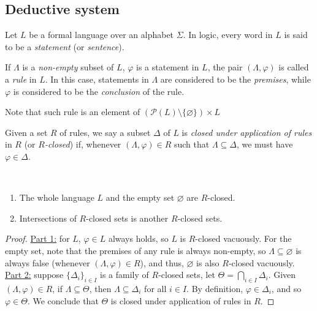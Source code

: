 \documentclass{treatise}
\begin{document}
\begin{shaded}
\section{Deductive system}
\begin{definition}
Let $L$ be a formal language over an alphabet $\Sigma$. In logic, every word in $L$ is said to be a \emph{statement} (or \emph{sentence}).
\end{definition}
\begin{definition}
If $\Lambda$ is a \textit{non-empty} subset of $L$, $\varphi$ is a statement in $L$, the pair $(\Lambda, \varphi)$ is called a \emph{rule} in $L$. In this case, statements in $\Lambda$ are considered to be the \emph{premises}, while $\varphi$ is considered to be the \emph{conclusion} of the rule.
\end{definition}
Note that such rule is an element of $(\mathcal{P}(L) \setminus \{ \varnothing \}) \times L$
\begin{definition}
Given a set $R$ of rules, we say a subset $\Delta$ of $L$ is \emph{closed under application of rules} in $R$ (or \emph{$R$-closed}) if, whenever $(\Lambda, \varphi) \in R$ such that $\Lambda \subseteq \Delta$, we must have $\varphi \in \Delta$.
\end{definition}
\begin{proposition} \label{logic-ent-prop}\ 
\begin{enumerate}
    \item The whole language $L$ and the empty set $\varnothing$ are $R$-closed.
    \item Intersections of $R$-closed sets is another $R$-closed sets.
\end{enumerate}
\end{proposition}
\begin{proof}
\underline{Part 1:} for $L$, $\varphi \in L$ always holds, so $L$ is $R$-closed vacuously. For the empty set, note that the premises of any rule is always non-empty, so $\Lambda \subseteq \varnothing$ is always false (whenever $(\Lambda, \varphi) \in R$), and thus, $\varnothing$ is also $R$-closed vacuously.
\\
\underline{Part 2:} suppose $\{ \Delta_i \}_{i \in I}$ is a family of $R$-closed sets, let $\Theta = \bigcap_{i \in I} \Delta_i$. Given $(\Lambda, \varphi) \in R$, if $\Lambda \subseteq \Theta$, then $\Lambda \subseteq \Delta_i$ for all $i \in I$. By definition, $\varphi \in \Delta_i$, and so $\varphi \in \Theta$. We conclude that $\Theta$ is closed under application of rules in $R$.
\end{proof}

\end{shaded}
\end{document}
